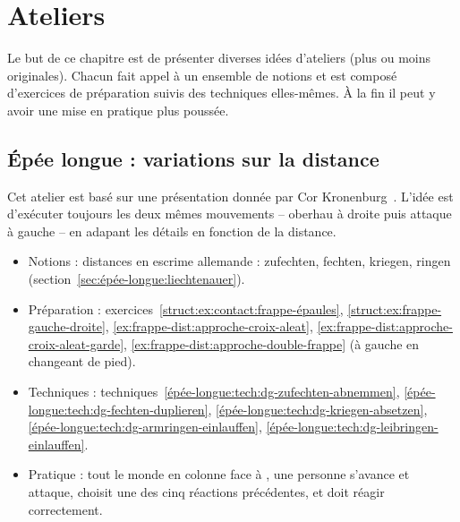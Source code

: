 \chapter{Ateliers}

Le but de ce chapitre est de présenter diverses idées d'ateliers (plus ou moins originales).
Chacun fait appel à un ensemble de notions et est composé d'exercices de préparation suivis des techniques elles-mêmes.
À la fin il peut y avoir une mise en pratique plus poussée.


\section{Épée longue : variations sur la distance}
\label{app:ateliers:épée-longue-variations-distance}

Cet atelier est basé sur une présentation donnée par Cor Kronenburg~\cite{kronenburg:dijon:going_distance:2015}.
L'idée est d'exécuter toujours les deux mêmes mouvements – oberhau à droite puis attaque à gauche – en adapant les détails en fonction de la distance.

\begin{itemize}
	\item Notions : distances en escrime allemande : zufechten, fechten, kriegen, ringen (section~\ref{sec:épée-longue:liechtenauer}).
	\item Préparation : exercices~\ref{struct:ex:contact:frappe-épaules}, \ref{struct:ex:frappe-gauche-droite}, \ref{ex:frappe-dist:approche-croix-aleat}, \ref{ex:frappe-dist:approche-croix-aleat-garde}, \ref{ex:frappe-dist:approche-double-frappe} (à gauche en changeant de pied).
	\item Techniques : techniques~\ref{épée-longue:tech:dg-zufechten-abnemmen}, \ref{épée-longue:tech:dg-fechten-duplieren}, \ref{épée-longue:tech:dg-kriegen-absetzen}, \ref{épée-longue:tech:dg-armringen-einlauffen}, \ref{épée-longue:tech:dg-leibringen-einlauffen}.
	\item Pratique : tout le monde en colonne face à \D, une personne \A s'avance et attaque, \D choisit une des cinq réactions précédentes, et \A doit réagir correctement.
\end{itemize}


